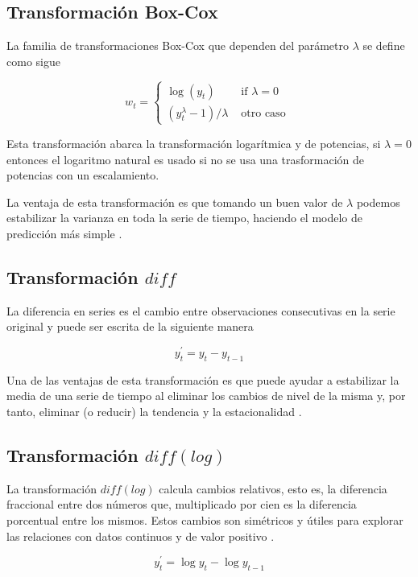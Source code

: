\subsection{Transformación Box-Cox}
La familia de transformaciones Box-Cox que dependen del parámetro $\lambda$ se define como sigue

\[
w_{t}= \begin{cases}\log \left(y_{t}\right) & \text { if } \lambda=0 \\ \left(y_{t}^{\lambda}-1\right) / \lambda & \text { otro caso }\end{cases}
\]

Esta transformación abarca la transformación logarítmica y de potencias, si $\lambda = 0$ entonces el logaritmo natural es usado si no se usa una trasformación de potencias con un escalamiento.

La ventaja de esta transformación es que tomando un buen valor de $\lambda$ podemos estabilizar la varianza en toda la serie de tiempo, haciendo el modelo de predicción más simple \cite{hyndmanForecastingPrinciplesPractice}. 

\subsection{Transformación $diff$}

La diferencia en series es el cambio entre observaciones consecutivas en la serie original y puede ser escrita de la siguiente manera

\[
y_{t}^{\prime}=y_{t}-y_{t-1}
\]

Una de las ventajas de esta transformación es que puede ayudar a estabilizar la media de una serie de tiempo al eliminar los cambios de nivel de la misma y, por tanto, eliminar (o reducir) la tendencia y la estacionalidad \cite{hyndmanForecastingPrinciplesPractice}.

\subsection{Transformación $diff(log)$}

La transformación $diff(log)$ calcula cambios relativos, esto es, la diferencia fraccional entre dos números que, multiplicado por cien es la diferencia porcentual entre los mismos. Estos cambios son simétricos y útiles para explorar las relaciones con datos continuos y de valor positivo \cite{coleStatisticsNotesPercentage2017}.

\[
y_{t}^{\prime}=\log{y_{t}}-\log{y_{t-1}}
\]

